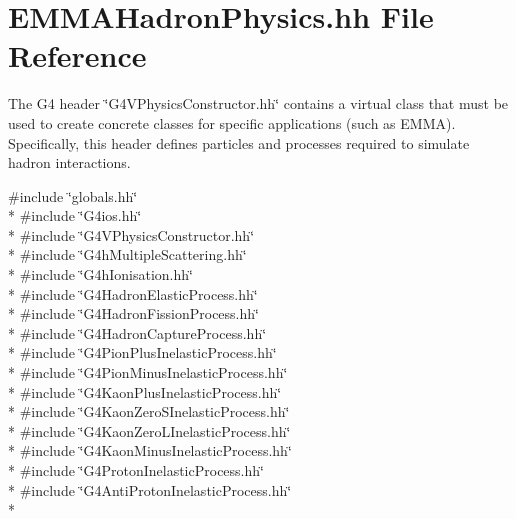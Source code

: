 \hypertarget{EMMAHadronPhysics_8hh}{\section{E\-M\-M\-A\-Hadron\-Physics.\-hh File Reference}
\label{EMMAHadronPhysics_8hh}
}


The G4 header \char`\"{}\-G4\-V\-Physics\-Constructor.\-hh\char`\"{} contains a virtual class that must be used to create concrete classes for specific applications (such as E\-M\-M\-A). Specifically, this header defines particles and processes required to simulate hadron interactions.  


{\ttfamily \#include \char`\"{}globals.\-hh\char`\"{}}\\*
{\ttfamily \#include \char`\"{}G4ios.\-hh\char`\"{}}\\*
{\ttfamily \#include \char`\"{}G4\-V\-Physics\-Constructor.\-hh\char`\"{}}\\*
{\ttfamily \#include \char`\"{}G4h\-Multiple\-Scattering.\-hh\char`\"{}}\\*
{\ttfamily \#include \char`\"{}G4h\-Ionisation.\-hh\char`\"{}}\\*
{\ttfamily \#include \char`\"{}G4\-Hadron\-Elastic\-Process.\-hh\char`\"{}}\\*
{\ttfamily \#include \char`\"{}G4\-Hadron\-Fission\-Process.\-hh\char`\"{}}\\*
{\ttfamily \#include \char`\"{}G4\-Hadron\-Capture\-Process.\-hh\char`\"{}}\\*
{\ttfamily \#include \char`\"{}G4\-Pion\-Plus\-Inelastic\-Process.\-hh\char`\"{}}\\*
{\ttfamily \#include \char`\"{}G4\-Pion\-Minus\-Inelastic\-Process.\-hh\char`\"{}}\\*
{\ttfamily \#include \char`\"{}G4\-Kaon\-Plus\-Inelastic\-Process.\-hh\char`\"{}}\\*
{\ttfamily \#include \char`\"{}G4\-Kaon\-Zero\-S\-Inelastic\-Process.\-hh\char`\"{}}\\*
{\ttfamily \#include \char`\"{}G4\-Kaon\-Zero\-L\-Inelastic\-Process.\-hh\char`\"{}}\\*
{\ttfamily \#include \char`\"{}G4\-Kaon\-Minus\-Inelastic\-Process.\-hh\char`\"{}}\\*
{\ttfamily \#include \char`\"{}G4\-Proton\-Inelastic\-Process.\-hh\char`\"{}}\\*
{\ttfamily \#include \char`\"{}G4\-Anti\-Proton\-Inelastic\-Process.\-hh\char`\"{}}\\*
